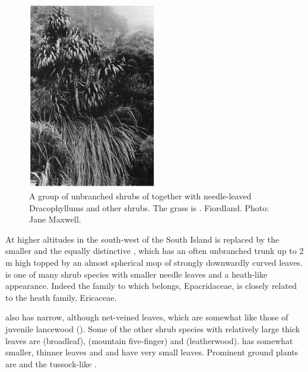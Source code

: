 \begin{figure}
	\includegraphics[width=0.5\textwidth]{graphics/figure92dracophyllum.jpg}
	\centering
	\caption[A group of unbranched shrubs of \emph{Dracophyllum fiordense}]{A group of unbranched shrubs of  together with needle-leaved Dracophyllums and other shrubs.
	The grass is .
	Fiordland.
	Photo: Jane Maxwell.}%
	\label{fig:92dracophyllum}
\end{figure}

At higher altitudes in the south-west of the South Island  is replaced by the smaller  and the equally distinctive , which has an often unbranched trunk up to 2 m high topped by an almost spherical mop of strongly downwardly curved leaves.  is one of many shrub species with smaller needle leaves and a heath-like appearance.
Indeed the family to which  belongs, Epacridaceae, is closely related to the heath family, Ericaceae.

 also has narrow, although net-veined leaves, which are somewhat like those of juvenile lancewood ().
Some of the other shrub species with relatively large thick leaves are  (broadleaf),  (mountain five-finger) and  (leatherwood).  has somewhat smaller, thinner leaves and  and  have very small leaves.
Prominent ground plants are  and the tussock-like .

